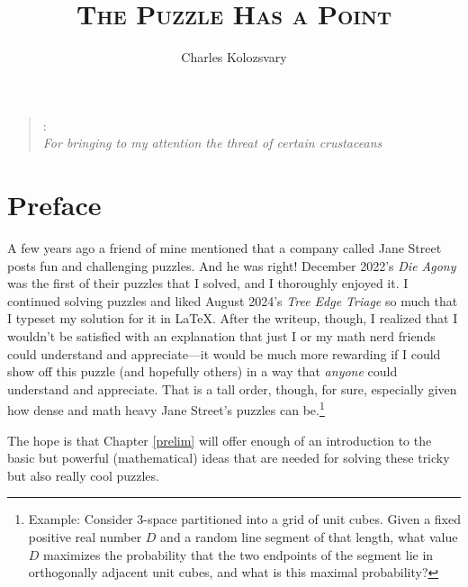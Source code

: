 \documentclass{book}
\theoremstyle{definition}
\theoremstyle{colonstylebf}
\begin{document}
\title{{\centering\Huge\textsc{The Puzzle Has a Point}}}
\author{\Large Charles Kolozsvary}
\date{}

\maketitle

\begin{quote}
{: \\ 
\hfill {\sl For bringing to my attention the threat of certain crustaceans}}
\end{quote}

\chapter*{Preface}

A few years ago a friend of mine mentioned that a company called Jane Street posts fun and challenging puzzles.
And he was right! December 2022's \emph{Die Agony} was the first of their puzzles that I solved, and I thoroughly enjoyed it. I continued solving puzzles and liked August 2024's \emph{Tree Edge Triage} so much that I typeset my solution for it in \LaTeX. After the writeup, though, I realized that
I wouldn't be satisfied with an explanation that just I or my math nerd friends could understand and appreciate---it would be much more rewarding if I could show off this puzzle (and hopefully others) in a way that \emph{anyone} could understand and appreciate. That is a tall order, though, for sure, especially given how dense and math heavy Jane Street's puzzles can be.\footnote{Example: Consider 3-space partitioned into a grid of unit cubes. 
Given a fixed positive real number $D$ and a random line segment of that length,
what value $D$ maximizes the probability that the two endpoints of the
segment lie in orthogonally adjacent unit cubes, and what is this maximal
probability?}

The hope is that Chapter \ref{prelim} will offer enough of an introduction to the basic but powerful (mathematical) ideas that are needed for solving these tricky but also really cool puzzles. 

\end{document}
